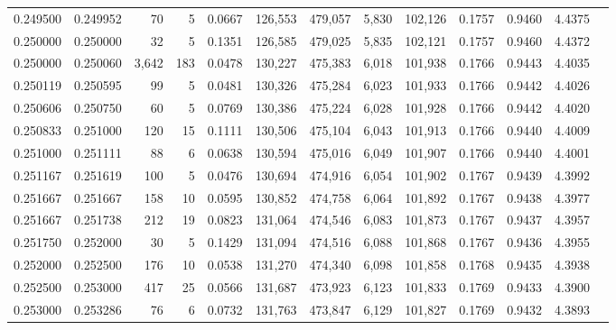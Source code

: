 \begin{tabular}{rrrrrrrrrrrrr}
0.249500 & 0.249952 &    70 &   5 &                                     0.0667 & 126,553 & 479,057 &   5,830 & 102,126 & 0.1757 & 0.9460 & 4.4375 \\
0.250000 & 0.250000 &    32 &   5 &                                     0.1351 & 126,585 & 479,025 &   5,835 & 102,121 & 0.1757 & 0.9460 & 4.4372 \\
0.250000 & 0.250060 & 3,642 & 183 &                                     0.0478 & 130,227 & 475,383 &   6,018 & 101,938 & 0.1766 & 0.9443 & 4.4035 \\
0.250119 & 0.250595 &    99 &   5 &                                     0.0481 & 130,326 & 475,284 &   6,023 & 101,933 & 0.1766 & 0.9442 & 4.4026 \\
0.250606 & 0.250750 &    60 &   5 &                                     0.0769 & 130,386 & 475,224 &   6,028 & 101,928 & 0.1766 & 0.9442 & 4.4020 \\
0.250833 & 0.251000 &   120 &  15 &                                     0.1111 & 130,506 & 475,104 &   6,043 & 101,913 & 0.1766 & 0.9440 & 4.4009 \\
0.251000 & 0.251111 &    88 &   6 &                                     0.0638 & 130,594 & 475,016 &   6,049 & 101,907 & 0.1766 & 0.9440 & 4.4001 \\
0.251167 & 0.251619 &   100 &   5 &                                     0.0476 & 130,694 & 474,916 &   6,054 & 101,902 & 0.1767 & 0.9439 & 4.3992 \\
0.251667 & 0.251667 &   158 &  10 &                                     0.0595 & 130,852 & 474,758 &   6,064 & 101,892 & 0.1767 & 0.9438 & 4.3977 \\
0.251667 & 0.251738 &   212 &  19 &                                     0.0823 & 131,064 & 474,546 &   6,083 & 101,873 & 0.1767 & 0.9437 & 4.3957 \\
0.251750 & 0.252000 &    30 &   5 &                                     0.1429 & 131,094 & 474,516 &   6,088 & 101,868 & 0.1767 & 0.9436 & 4.3955 \\
0.252000 & 0.252500 &   176 &  10 &                                     0.0538 & 131,270 & 474,340 &   6,098 & 101,858 & 0.1768 & 0.9435 & 4.3938 \\
0.252500 & 0.253000 &   417 &  25 &                                     0.0566 & 131,687 & 473,923 &   6,123 & 101,833 & 0.1769 & 0.9433 & 4.3900 \\
0.253000 & 0.253286 &    76 &   6 &                                     0.0732 & 131,763 & 473,847 &   6,129 & 101,827 & 0.1769 & 0.9432 & 4.3893 \\

\end{tabular}
